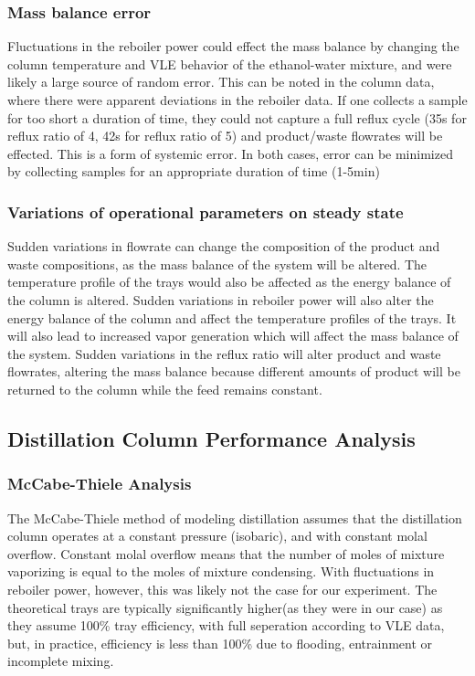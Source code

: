 \documentclass[lettersize,journal]{IEEEtran}
\begin{document}
\subsubsection{Mass balance error}
Fluctuations in the reboiler power could effect the mass balance by changing the column temperature and VLE behavior of the ethanol-water mixture, and were likely a large source of random error. This can be noted in the column data, where there were apparent deviations in the reboiler data. If one collects a sample for too short a duration of time, they could not capture a full reflux cycle (35s for reflux ratio of 4, 42s for reflux ratio of 5) and product/waste flowrates will be effected. This is a form of systemic error. In both cases, error can be minimized by collecting samples for an appropriate duration of time (1-5min)
\subsubsection{Variations of operational parameters on steady state}
Sudden variations in flowrate can change the composition of the product and waste compositions, as the mass balance of the system will be altered. The temperature profile of the trays would also be affected as the energy balance of the column is altered. Sudden variations in reboiler power will also alter the energy balance of the column and affect the temperature profiles of the trays. It will also lead to increased vapor generation which will affect the mass balance of the system.
Sudden variations in the reflux ratio will alter product and waste flowrates, altering the mass balance because different amounts of product will be returned to the column while the feed remains constant.
\subsection{Distillation Column Performance Analysis}
\subsubsection{McCabe-Thiele Analysis}
The McCabe-Thiele method of modeling distillation assumes that the distillation column operates at a constant pressure (isobaric), and with constant molal overflow. Constant molal overflow means that the number of moles of mixture vaporizing is equal to the moles of mixture condensing. With fluctuations in reboiler power, however, this was likely not the case for our experiment. The theoretical trays are typically significantly higher(as they were in our case) as they assume 100\% tray efficiency, with full seperation according to VLE data, but, in practice, efficiency is less than 100\% due to flooding, entrainment or incomplete mixing.
\end{document}
